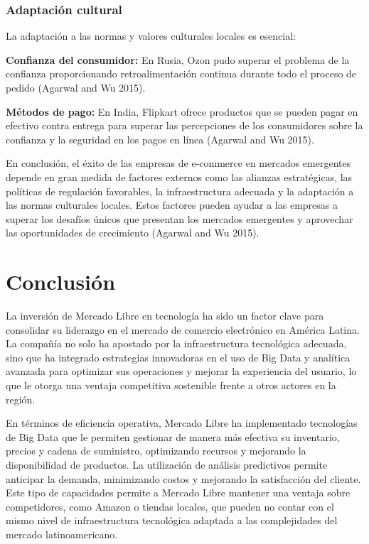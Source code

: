 \documentclass{article}
\begin{document}
\subsubsection{Adaptación cultural}\label{adaptaciuxf3n-cultural}

La adaptación a las normas y valores culturales locales es esencial:

\textbf{Confianza del consumidor:} En Rusia, Ozon pudo superar el
problema de la confianza proporcionando retroalimentación continua
durante todo el proceso de pedido (Agarwal and Wu 2015).

\textbf{Métodos de pago:} En India, Flipkart ofrece productos que se
pueden pagar en efectivo contra entrega para superar las percepciones de
los consumidores sobre la confianza y la seguridad en los pagos en línea
(Agarwal and Wu 2015).

En conclusión, el éxito de las empresas de e-commerce en mercados
emergentes depende en gran medida de factores externos como las alianzas
estratégicas, las políticas de regulación favorables, la infraestructura
adecuada y la adaptación a las normas culturales locales. Estos factores
pueden ayudar a las empresas a superar los desafíos únicos que presentan
los mercados emergentes y aprovechar las oportunidades de crecimiento
(Agarwal and Wu 2015).

\section{Conclusión}\label{conclusiuxf3n}

La inversión de Mercado Libre en tecnología ha sido un factor clave para
consolidar su liderazgo en el mercado de comercio electrónico en América
Latina. La compañía no solo ha apostado por la infraestructura
tecnológica adecuada, sino que ha integrado estrategias innovadoras en
el uso de Big Data y analítica avanzada para optimizar sus operaciones y
mejorar la experiencia del usuario, lo que le otorga una ventaja
competitiva sostenible frente a otros actores en la región.

En términos de eficiencia operativa, Mercado Libre ha implementado
tecnologías de Big Data que le permiten gestionar de manera más efectiva
su inventario, precios y cadena de suministro, optimizando recursos y
mejorando la disponibilidad de productos. La utilización de análisis
predictivos permite anticipar la demanda, minimizando costos y mejorando
la satisfacción del cliente. Este tipo de capacidades permite a Mercado
Libre mantener una ventaja sobre competidores, como Amazon o tiendas
locales, que pueden no contar con el mismo nivel de infraestructura
tecnológica adaptada a las complejidades del mercado latinoamericano.
\end{document}
